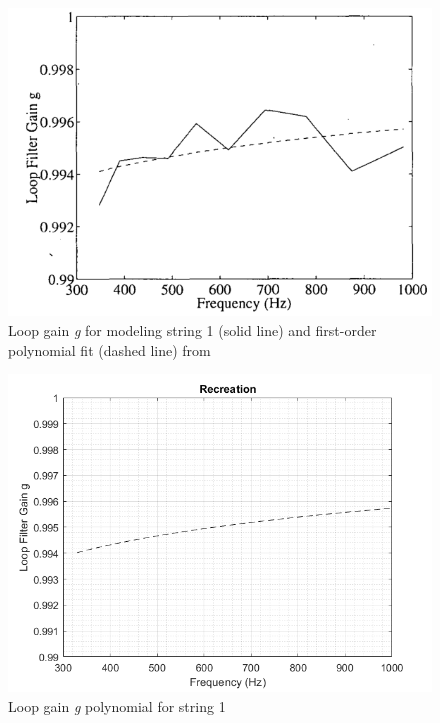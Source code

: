 \documentclass[../main.tex]{subfiles}
\begin{document}
\begin{figure}[h]
    \centering
    \includegraphics[scale=.75]{./images/plots/Figure18Orig.png}
    \caption{Loop gain \emph{g} for modeling string 1 (solid line) and first-order polynomial fit (dashed line) from }
    \label{fig:Fig18Orig}
\end{figure}

\begin{figure}[h]
    \centering
    \includegraphics[scale=.65]{./images/plots/Figure18Recon.png}
    \caption{Loop gain \emph{g} polynomial for string 1}
    \label{fig:Fig18Recon}
\end{figure}
\end{document}
